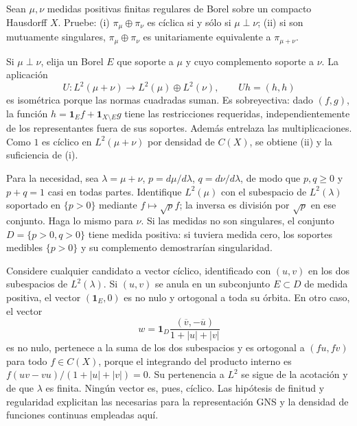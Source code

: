 \begin{ejercicio}\label{ej:v3-l30-1}
Sean $\mu,\nu$ medidas positivas finitas regulares de Borel sobre un compacto Hausdorff $X$. Pruebe: (i) $\pi_\mu\oplus\pi_\nu$ es cíclica si y sólo si $\mu\perp\nu$; (ii) si son mutuamente singulares, $\pi_\mu\oplus\pi_\nu$ es unitariamente equivalente a $\pi_{\mu+\nu}$.
\end{ejercicio}
\begin{solucion}
Si $\mu\perp\nu$, elija un Borel $E$ que soporte a $\mu$ y cuyo complemento soporte a $\nu$. La aplicación
\[
 U:L^2(\mu+\nu)\to L^2(\mu)\oplus L^2(\nu),\qquad
 Uh=(h,h)
\]
es isométrica porque las normas cuadradas suman. Es sobreyectiva: dado $(f,g)$, la función $h=\mathbf1_Ef+\mathbf1_{X\setminus E}g$ tiene las restricciones requeridas, independientemente de los representantes fuera de sus soportes. Además entrelaza las multiplicaciones. Como $1$ es cíclico en $L^2(\mu+\nu)$ por densidad de $C(X)$, se obtiene (ii) y la suficiencia de (i).

Para la necesidad, sea $\lambda=\mu+\nu$, $p=d\mu/d\lambda$, $q=d\nu/d\lambda$, de modo que $p,q\ge0$ y $p+q=1$ casi en todas partes. Identifique $L^2(\mu)$ con el subespacio de $L^2(\lambda)$ soportado en $\{p>0\}$ mediante $f\mapsto\sqrt p f$; la inversa es división por $\sqrt p$ en ese conjunto. Haga lo mismo para $\nu$. Si las medidas no son singulares, el conjunto $D=\{p>0,q>0\}$ tiene medida positiva: si tuviera medida cero, los soportes medibles $\{p>0\}$ y su complemento demostrarían singularidad.

Considere cualquier candidato a vector cíclico, identificado con $(u,v)$ en los dos subespacios de $L^2(\lambda)$. Si $(u,v)$ se anula en un subconjunto $E\subset D$ de medida positiva, el vector $(\mathbf1_E,0)$ es no nulo y ortogonal a toda su órbita. En otro caso, el vector
\[
 w=\mathbf1_D\frac{(\overline v,-\overline u)}{1+|u|+|v|}
\]
es no nulo, pertenece a la suma de los dos subespacios y es ortogonal a $(fu,fv)$ para todo $f\in C(X)$, porque el integrando del producto interno es $f(uv-vu)/(1+|u|+|v|)=0$. Su pertenencia a $L^2$ se sigue de la acotación y de que $\lambda$ es finita. Ningún vector es, pues, cíclico. Las hipótesis de finitud y regularidad explicitan las necesarias para la representación GNS y la densidad de funciones continuas empleadas aquí.
\end{solucion}

